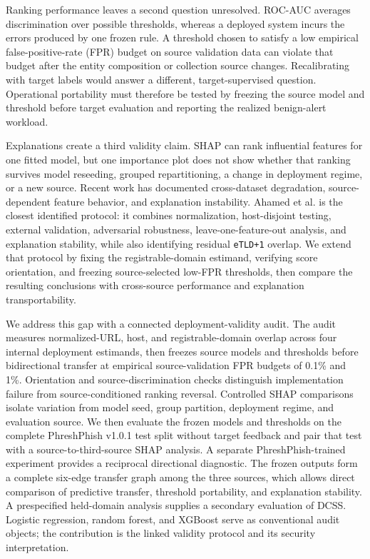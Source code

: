 \documentclass[
  10pt,
]{article}
\begin{document}
Ranking performance leaves a second question unresolved. ROC-AUC
averages discrimination over possible thresholds, whereas a deployed
system incurs the errors produced by one frozen rule. A threshold chosen
to satisfy a low empirical false-positive-rate (FPR) budget on source
validation data can violate that budget after the entity composition or
collection source changes. Recalibrating with target labels would answer
a different, target-supervised question. Operational portability must
therefore be tested by freezing the source model and threshold before
target evaluation and reporting the realized benign-alert workload.

Explanations create a third validity claim. SHAP can rank influential
features for one fitted model, but one importance plot does not show
whether that ranking survives model reseeding, grouped repartitioning, a
change in deployment regime, or a new
source\citep{Lundberg2017, Lundberg2020, AlvarezMelis2018, Ghorbani2019, Warnecke2020}.
Recent work has documented cross-dataset degradation, source-dependent
feature behavior, and explanation
instability\citep{Rashid2024, Yi2026, Mia2024, Ahamed2026, Tolay2026, Shafin2025, Calzarossa2025Robust, Calzarossa2025Framework, Kehkashan2025}.
Ahamed et al.\citep{Ahamed2026} is the closest identified protocol: it
combines normalization, host-disjoint testing, external validation,
adversarial robustness, leave-one-feature-out analysis, and explanation
stability, while also identifying residual \texttt{eTLD+1} overlap. We
extend that protocol by fixing the registrable-domain estimand,
verifying score orientation, and freezing source-selected low-FPR
thresholds, then compare the resulting conclusions with cross-source
performance and explanation transportability.

We address this gap with a connected deployment-validity audit. The
audit measures normalized-URL, host, and registrable-domain overlap
across four internal deployment estimands, then freezes source models
and thresholds before bidirectional transfer at empirical
source-validation FPR budgets of 0.1\% and 1\%. Orientation and
source-discrimination checks distinguish implementation failure from
source-conditioned ranking reversal. Controlled SHAP comparisons isolate
variation from model seed, group partition, deployment regime, and
evaluation source. We then evaluate the frozen models and thresholds on
the complete PhreshPhish v1.0.1 test split without target feedback and
pair that test with a source-to-third-source SHAP analysis. A separate
PhreshPhish-trained experiment provides a reciprocal directional
diagnostic. The frozen outputs form a complete six-edge transfer graph
among the three sources, which allows direct comparison of predictive
transfer, threshold portability, and explanation stability. A
prespecified held-domain analysis supplies a secondary evaluation of
DCSS. Logistic regression, random forest, and XGBoost serve as
conventional audit objects; the contribution is the linked validity
protocol and its security interpretation.
\end{document}
